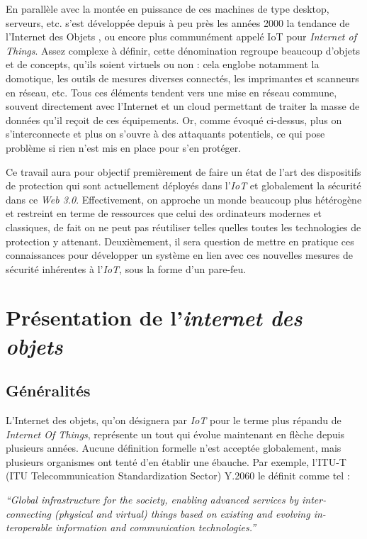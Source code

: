 \documentclass[]{article}
\begin{document}
\par En parallèle avec la montée en puissance de ces machines de type desktop, serveurs, etc. s'est développée depuis à peu près les années 2000 la tendance de l'\og Internet des Objets \fg{}, ou encore plus communément appelé IoT pour \textit{Internet of Things}. Assez complexe à définir, cette dénomination regroupe beaucoup d'objets et de concepts, qu'ils soient virtuels ou non : cela englobe notamment la domotique, les outils de mesures diverses connectés, les imprimantes et scanneurs en réseau, etc. Tous ces éléments tendent vers une mise en réseau commune, souvent directement avec l'Internet et un cloud permettant de traiter la masse de données qu'il reçoit de ces équipements. Or, comme évoqué ci-dessus, plus on s'interconnecte et plus on s'ouvre à des attaquants potentiels, ce qui pose problème si rien n'est mis en place pour s'en protéger.\\

\par Ce travail aura pour objectif premièrement de faire un état de l'art des dispositifs de protection qui sont actuellement déployés dans l'\textit{IoT} et globalement la sécurité dans ce \textit{Web 3.0}. Effectivement, on approche un monde beaucoup plus hétérogène et restreint en terme de ressources que celui des ordinateurs modernes et classiques, de fait on ne peut pas réutiliser telles quelles toutes les technologies de protection y attenant. Deuxièmement, il sera question de mettre en pratique ces connaissances pour développer un système en lien avec ces nouvelles mesures de sécurité inhérentes à l'\textit{IoT}, sous la forme d'un pare-feu.

\newpage
\section{Présentation de l'\textit{internet des objets}}

\subsection{Généralités}

\par L'Internet des objets, qu'on désignera par \textit{IoT} pour le terme plus répandu de \textit{Internet Of Things}, représente un tout qui évolue maintenant en flèche depuis plusieurs années. Aucune définition formelle n'est acceptée globalement, mais plusieurs organismes ont tenté d'en établir une ébauche. Par exemple, l'ITU-T (ITU Telecommunication Standardization Sector) Y.2060 le définit comme tel : 
\begin{center}
\textit{“Global  infrastructure  for  the  society,  enabling  advanced  services  by  inter-connecting (physical and virtual) things based on existing and evolving in-teroperable information and communication technologies.”}
\end{center}
\end{document}
